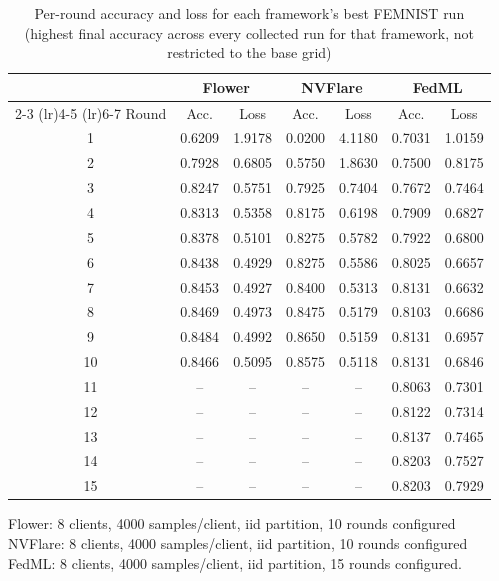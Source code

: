 \begin{table}[htbp]
\centering
\caption{Per-round accuracy and loss for each framework's best FEMNIST run (highest final accuracy across every collected run for that framework, not restricted to the base grid)}
\label{tab:convergence-femnist}
\begin{tabular}{c cc cc cc}
\toprule
 & \multicolumn{2}{c}{Flower} & \multicolumn{2}{c}{NVFlare} & \multicolumn{2}{c}{FedML} \\
\cmidrule(lr){2-3} \cmidrule(lr){4-5} \cmidrule(lr){6-7}
Round & Acc. & Loss & Acc. & Loss & Acc. & Loss \\
\midrule
1 & 0.6209 & 1.9178 & 0.0200 & 4.1180 & 0.7031 & 1.0159 \\
2 & 0.7928 & 0.6805 & 0.5750 & 1.8630 & 0.7500 & 0.8175 \\
3 & 0.8247 & 0.5751 & 0.7925 & 0.7404 & 0.7672 & 0.7464 \\
4 & 0.8313 & 0.5358 & 0.8175 & 0.6198 & 0.7909 & 0.6827 \\
5 & 0.8378 & 0.5101 & 0.8275 & 0.5782 & 0.7922 & 0.6800 \\
6 & 0.8438 & 0.4929 & 0.8275 & 0.5586 & 0.8025 & 0.6657 \\
7 & 0.8453 & 0.4927 & 0.8400 & 0.5313 & 0.8131 & 0.6632 \\
8 & 0.8469 & 0.4973 & 0.8475 & 0.5179 & 0.8103 & 0.6686 \\
9 & 0.8484 & 0.4992 & 0.8650 & 0.5159 & 0.8131 & 0.6957 \\
10 & 0.8466 & 0.5095 & 0.8575 & 0.5118 & 0.8131 & 0.6846 \\
11 & -- & -- & -- & -- & 0.8063 & 0.7301 \\
12 & -- & -- & -- & -- & 0.8122 & 0.7314 \\
13 & -- & -- & -- & -- & 0.8137 & 0.7465 \\
14 & -- & -- & -- & -- & 0.8203 & 0.7527 \\
15 & -- & -- & -- & -- & 0.8203 & 0.7929 \\
\bottomrule
\end{tabular}
\vspace{0.5em}
\footnotesize
Flower: 8 clients, 4000 samples/client, iid partition, 10 rounds configured\\ NVFlare: 8 clients, 4000 samples/client, iid partition, 10 rounds configured\\ FedML: 8 clients, 4000 samples/client, iid partition, 15 rounds configured.
\end{table}

